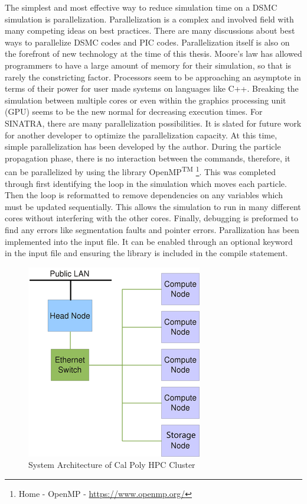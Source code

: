 \indent The simplest and most effective way to reduce simulation time on a DSMC simulation is parallelization. Parallelization is a complex and involved field with many competing ideas on best practices. There are many discussions about best ways to parallelize DSMC codes and PIC codes. Parallelization itself is also on the forefront of new technology at the time of this thesis. Moore's law has allowed programmers to have a large amount of memory for their simulation, so that is rarely the constricting factor. Processors seem to be approaching an asymptote in terms of their power for user made systems on languages like C++. Breaking the simulation between multiple cores or even within the graphics processing unit (GPU) seems to be the new normal for decreasing execution times. For SINATRA, there are many parallelization possibilities. It is slated for future work for another developer to optimize the parallelization capacity. At this time, simple parallelization has been developed by the author. During the particle propagation phase, there is no interaction between the commands, therefore, it can be parallelized by using the library OpenMP\textsuperscript{TM} \footnote{Home - OpenMP - \url{https://www.openmp.org/}}. This was completed through first identifying the loop in the simulation which moves each particle. Then the loop is reformatted to remove dependencies on any variables which must be updated sequentially. This allows the simulation to run in many different cores without interfering with the other cores. Finally, debugging is preformed to find any errors like segmentation faults and pointer errors. Parallization has been implemented into the input file. It can be enabled through an optional keyword in the input file and ensuring the library is included in the compile statement. \par


\begin{figure}
\includegraphics[width=.55\textwidth]{figures/HPC_cluster.png}
\centering
\caption[System Architecture of Cal Poly HPC Cluster]{System Architecture of Cal Poly HPC Cluster \textmd{\cite{hpc}}}
\label{fig:hpccluser}
\end{figure}


